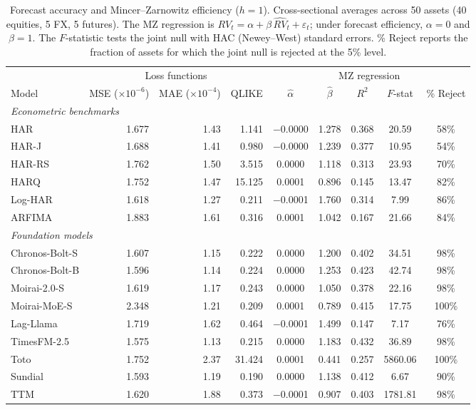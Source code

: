 \begin{table}[H]
\centering
\singlespacing
\caption{Forecast accuracy and Mincer--Zarnowitz efficiency ($h = 1$). Cross-sectional averages across 50 assets (40 equities, 5 FX, 5 futures). The MZ regression is $RV_t = \alpha + \beta \, \widehat{RV}_t + \varepsilon_t$; under forecast efficiency, $\alpha = 0$ and $\beta = 1$. The $F$-statistic tests the joint null with HAC (Newey--West) standard errors. \% Reject reports the fraction of assets for which the joint null is rejected at the 5\% level.}
\label{tab:mz}
\footnotesize\setlength{\tabcolsep}{4pt}\renewcommand{\arraystretch}{0.85}
\begin{tabular}{lrrr ccccc}
\toprule
 & \multicolumn{3}{c}{Loss functions} & \multicolumn{5}{c}{MZ regression} \\
\cmidrule(lr){2-4} \cmidrule(lr){5-9}
Model & MSE ($\times 10^{-6}$) & MAE ($\times 10^{-4}$) & QLIKE & $\hat{\alpha}$ & $\hat{\beta}$ & $R^2$ & $F$-stat & \% Reject \\
\midrule
\multicolumn{9}{l}{\textit{Econometric benchmarks}} \\
HAR          & 1.677 & 1.43 & 1.141 & $-$0.0000 & 1.278 & 0.368 & 20.59 & 58\% \\
HAR-J        & 1.688 & 1.41 & 0.980 & $-$0.0000 & 1.239 & 0.377 & 10.95 & 54\% \\
HAR-RS       & 1.762 & 1.50 & 3.515 &    0.0000 & 1.118 & 0.313 & 23.93 & 70\% \\
HARQ         & 1.752 & 1.47 & 15.125 &    0.0001 & 0.896 & 0.145 & 13.47 & 82\% \\
Log-HAR      & 1.618 & 1.27 & 0.211 & $-$0.0001 & 1.760 & 0.314 &  7.99 & 86\% \\
ARFIMA       & 1.883 & 1.61 & 0.316 &    0.0001 & 1.042 & 0.167 & 21.66 & 84\% \\
\midrule
\multicolumn{9}{l}{\textit{Foundation models}} \\
Chronos-Bolt-S & 1.607 & 1.15 & 0.222 &  0.0000 & 1.200 & 0.402 & 34.51 & 98\% \\
Chronos-Bolt-B & 1.596 & 1.14 & 0.224 &  0.0000 & 1.253 & 0.423 & 42.74 & 98\% \\
Moirai-2.0-S   & 1.619 & 1.17 & 0.243 &  0.0000 & 1.050 & 0.378 & 22.16 & 98\% \\
Moirai-MoE-S   & 2.348 & 1.21 & 0.209 &  0.0001 & 0.789 & 0.415 & 17.75 &100\% \\
Lag-Llama    & 1.719 & 1.62 & 0.464 & $-$0.0001 & 1.499 & 0.147 &  7.17 & 76\% \\
TimesFM-2.5    & 1.575 & 1.13 & 0.215 &  0.0000 & 1.183 & 0.432 & 36.89 & 98\% \\
Toto           & 1.752 & 2.37 & 31.424 &  0.0001 & 0.441 & 0.257 & 5860.06 &100\% \\
Sundial        & 1.593 & 1.19 & 0.190 &  0.0000 & 1.138 & 0.412 &  6.67 & 90\% \\
TTM            & 1.620 & 1.88 & 0.373 & $-$0.0001 & 0.907 & 0.403 & 1781.81 & 98\% \\
\bottomrule
\end{tabular}
\end{table}
